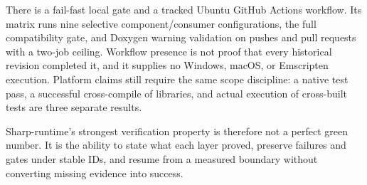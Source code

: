 There is a fail-fast local gate and a tracked Ubuntu GitHub Actions workflow. Its matrix runs
nine selective component/consumer configurations, the full compatibility gate, and Doxygen
warning validation on pushes and pull requests with a two-job ceiling. Workflow presence is not
proof that every historical revision completed it, and it supplies no Windows, macOS, or
Emscripten execution. Platform claims still require the same scope discipline: a native test
pass, a successful cross-compile of libraries, and actual execution of cross-built tests are
three separate results.

Sharp-runtime's strongest verification property is therefore not a perfect green number. It is
the ability to state what each layer proved, preserve failures and gates under stable IDs, and
resume from a measured boundary without converting missing evidence into success.

